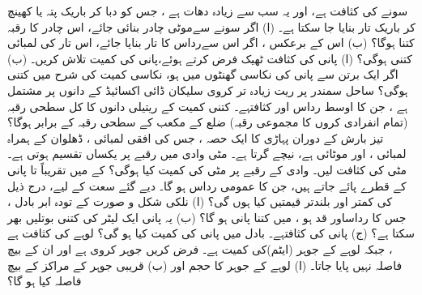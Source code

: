 سونے کی کثافت ہے، اور یہ سب سے زیادہ  دھات ہے ، جس کو دبا کر باریک پتہ  یا کھینچ کر باریک تار بنایا  جا سکتا ہے۔ (ا) اگر سونے 
سےموٹی چادر بنائی جائے، اس چادر کا رقبہ کتنا ہوگا؟   (ب) اس کے برعکس ، اگر اس
 سےرداس کا  تار بنایا  جائے، اس تار کی لمبائی کتنی ہوگی؟ 
(ا)  پانی کی کثافت ٹھیک فرض کرتے ہوئے،پانی کی کمیت تلاش کریں۔ 
(ب) اگر ایک برتن سے پانی کی نکاسی گھنٹوں میں  ہو، نکاسی کمیت کی شرح میں  کتنی  ہوگی؟ 
 ساحل سمندر پر ریت زیادہ تر  کروی سلیکان ڈائی اکسائیڈ کے دانوں پر مشتمل ہے ، جن کا اوسط رداس اور 
 کثافتہے۔ کتنی کمیت کے ریتیلی دانوں کا کل سطحی رقبہ (تمام انفرادی کروں کا مجموعی رقبہ)
   ضلع   کے  مکعب کے  سطحی رقبہ کے برابر ہوگا؟ 
تیز بارش کے دوران پہاڑی کا ایک حصہ ، جس کی افقی  لمبائی ، ڈھلوان کے ہمراہ لمبائی ، اور موٹائی  ہے،  نیچے گرتا ہے۔  مٹی وادی میں  رقبے پر یکساں تقسیم ہوتی ہے۔ مٹی کی کثافت لیں۔ وادی کے رقبے پر مٹی کی کمیت کیا ہوگی؟
 کے   میں تقریباً  تا پانی کے قطرے پائے جاتے ہیں، جن کا عمومی   رداس ہو گا۔ دیے گئے  سعت  کے لیے، درج ذیل کی کمتر اور بلندتر قیمتیں کیا ہوں گی؟  (ا) نلکی شکل  و صورت کے تودہ ابر بادل ، جس کا  رداساور قد  ہو ، میں کتنا  پانی  ہو  گا؟  (ب) یہ پانی ایک لیٹر کی  کتنی بوتلیں بھر سکتا ہے؟  (ج) پانی کی کثافتہے۔   بادل میں  پانی کی کمیت کیا ہو گی؟ 
لوہے کی کثافت ہے ، جبکہ لوہے کے جوہر  (ایٹم)کی کمیت ہے۔ فرض کریں  جوہر کروی ہے اور ان کے بیچ  فاصلہ نہیں پایا جاتا۔  (ا)   لوہے کے جوہر کا حجم اور  (ب) قریبی جوہر کے مراکز کے بیچ فاصلہ کیا  ہو گا؟ 
